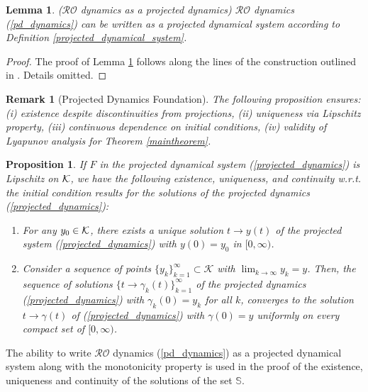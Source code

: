 \documentclass[journal,twoside,web]{ieeecolor}
\newcommand{\rev}[1]{\textcolor{revisionblue}{#1}}
\newtheorem{lemma}{Lemma}
\newtheorem{proposition}[theorem]{Proposition}
\newtheorem{remark}{Remark}
\begin{document}
\begin{lemma} \label{projected} ($\mathcal{RO}$ dynamics as a projected dynamics)
$\mathcal{RO}$ dynamics (\ref{pd_dynamics}) can be written as a projected dynamical system according to Definition \ref{projected_dynamical_system}.
\end{lemma}
\begin{proof}
The proof of Lemma \ref{projected} follows along the lines of the construction outlined in \cite{cherukuri2016}. Details omitted.
\end{proof}

\begin{remark}[\rev{Projected Dynamics Foundation}]
\rev{The following proposition ensures: (i) existence despite discontinuities from projections, (ii) uniqueness via Lipschitz property, (iii) continuous dependence on initial conditions, (iv) validity of Lyapunov analysis for Theorem \ref{maintheorem}.}
\end{remark}

\begin{proposition} \label{proposition_projected}
If $F$ in the projected dynamical system (\ref{projected_dynamics}) is Lipschitz on ${\cal K}$, we have the following existence, uniqueness, and continuity w.r.t. the initial condition results for the solutions of the projected dynamics (\ref{projected_dynamics}):
\begin{enumerate}
\item For any $y_{0} \in {\cal K}$, there exists a unique solution $t \rightarrow y(t)$ of the projected system (\ref{projected_dynamics}) with $y(0)=y_{0}$ in $[0,\infty)$.
\item Consider a sequence of points $\{y_{k}\}_{k=1}^\infty \subset {\mathcal K}$ with $\lim_{k \rightarrow \infty} y_k=y$. Then, the sequence of solutions $\{t \rightarrow \gamma_k(t)\}_{k=1}^\infty$ of the projected dynamics (\ref{projected_dynamics}) with $\gamma_k(0)=y_k$ for all $k$, converges to the solution $t \rightarrow \gamma(t)$ of (\ref{projected_dynamics}) with $\gamma(0)=y$ uniformly on every compact set of $[0,\infty)$.
\end{enumerate}
\end{proposition}
The ability to write $\mathcal{RO}$ dynamics (\ref{pd_dynamics}) as a projected dynamical system along with the monotonicity property is used in the proof of the existence, uniqueness and continuity of the solutions of the set ${\mathbb S}$.
\end{document}
